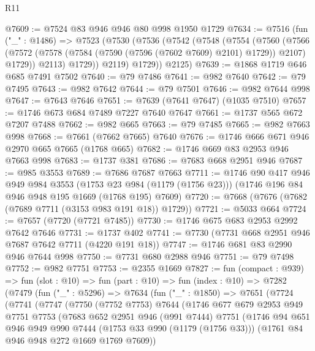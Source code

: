 \begin{lexlean}{R11}
\begin{coremodule}
@7609 := @7524 @83 @946 @946 @80 @998 @1950 @1729
@7634 := @7516
    (fun ("_" : @1486) =>
    @7523
      (@7530
        (@7536
          (@7542
            (@7548
              (@7554
                (@7560
                  (@7566
                    (@7572 (@7578 (@7584 (@7590 (@7596 (@7602 @7609) @2101) @1729)) @2107) @1729))
                  @2113)
                @1729))
            @2119)
          @1729))
      @2125)
@7639 := @1868 @1719 @646 @685 @7491 @7502
@7640 := @79 @7486
@7641 := @982 @7640
@7642 := @79 @7495
@7643 := @982 @7642
@7644 := @79 @7501
@7646 := @982 @7644 @998
@7647 := @7643 @7646
@7651 := @7639 (@7641 @7647) (@1035 @7510)
@7657 := @1746 @673 @684 @7489 @7227 @7640 @7647
@7661 := @1737 @565 @672 @7207 @7488
@7662 := @982 @665
@7663 := @79 @7485
@7665 := @982 @7663 @998
@7668 := @7661 (@7662 @7665) @7640
@7676 := @1746 @666 @671 @946 @2970 @665 @7665 (@1768 @665)
@7682 := @1746 @669 @83 @2953 @946 @7663 @998
@7683 := @1737 @381
@7686 := @7683 @668 @2951 @946
@7687 := @985 @3553
@7689 := @7686 @7687 @7663
@7711 := @1746
    @90
    @417
    @946
    @949
    @984
    @3553
    (@1753 @23 @984 (@1179 (@1756 @23)))
    (@1746 @196 @84 @946 @948 @195 @1669 (@1768 @195) @7609)
@7720 := @7668 (@7676 (@7682 (@7689 @7711 (@3153 @983 @191 @18)) @1729))
@7721 := @5033 @664
@7724 := @7657 (@7720 (@7721 @7485))
@7730 := @1746 @675 @683 @2953 @2992 @7642 @7646
@7731 := @1737 @402
@7741 := @7730 (@7731 @668 @2951 @946 @7687 @7642 @7711 (@4220 @191 @18))
@7747 := @1746 @681 @83 @2990 @946 @7644 @998
@7750 := @7731 @680 @2988 @946
@7751 := @79 @7498
@7752 := @982 @7751
@7753 := @2355 @1669
@7827 := fun (compact : @939) =>
  fun (slot : @10) =>
  fun (part : @10) =>
  fun (index : @10) =>
  @7282
    (@7479
      (fun ("_" : @5296) =>
      @7634
        (fun ("_" : @1850) =>
        @7651
          (@7724
            (@7741
              (@7747
                (@7750
                  (@7752 @7753)
                  @7644
                  (@1746
                    @677
                    @679
                    @2953
                    @949
                    @7751
                    @7753
                    (@7683
                      @652
                      @2951
                      @946
                      (@991 @7444)
                      @7751
                      (@1746
                        @94
                        @651
                        @946
                        @949
                        @990
                        @7444
                        (@1753 @33 @990 (@1179 (@1756 @33)))
                        (@1761 @84 @946 @948 @272 @1669 @1769 @7609))

\end{coremodule}
\end{lexlean}
